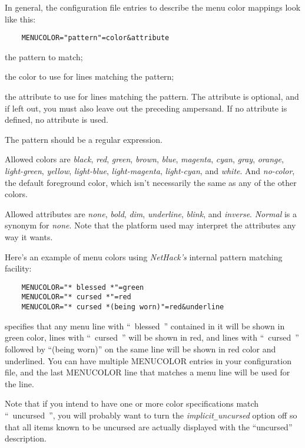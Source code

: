 In general, the configuration file entries to describe the menu color mappings
look like this:
\begin{verbatim}
    MENUCOLOR="pattern"=color&attribute
\end{verbatim}

\blist{}
\item[\ib{pattern}]
the pattern to match;
\item[\ib{color}]
the color to use for lines matching the pattern;
\item[\ib{attribute}]
the attribute to use for lines matching the pattern. The attribute is
optional, and if left out, you must also leave out the preceding ampersand.
If no attribute is defined, no attribute is used.
\elist

The pattern should be a regular expression.

Allowed colors are {\it black}, {\it red}, {\it green}, {\it brown},
{\it blue}, {\it magenta}, {\it cyan}, {\it gray}, {\it orange},
{\it light-green}, {\it yellow}, {\it light-blue}, {\it light-magenta},
{\it light-cyan}, and {\it white}.
And {\it no-color}, the default foreground color, which isn't necessarily
the same as any of the other colors.

Allowed attributes are {\it none}, {\it bold}, {\it dim}, {\it underline},
{\it blink}, and {\it inverse}.
{\it Normal\/} is a synonym for {\it none}.
Note that the platform used may interpret the attributes any way it
wants.

Here's an example of menu colors using {\it NetHack's\/} internal
pattern matching facility:

\begin{verbatim}
    MENUCOLOR="* blessed *"=green
    MENUCOLOR="* cursed *"=red
    MENUCOLOR="* cursed *(being worn)"=red&underline
\end{verbatim}

specifies that any menu line with ``~blessed~'' contained
in it will be shown in green color, lines with ``~cursed~'' will be
shown in red, and lines with ``~cursed~'' followed by ``(being worn)''
on the same line will be shown in red color and underlined.
You can have multiple MENUCOLOR entries in your configuration file,
and the last MENUCOLOR line that matches
a menu line will be used for the line.

Note that if you intend to have one or more color specifications match
``~uncursed~'', you will probably want to turn the
{\it implicit\verb+_+uncursed\/}
option off so that all items known to be uncursed are actually
displayed with the ``uncursed'' description.

